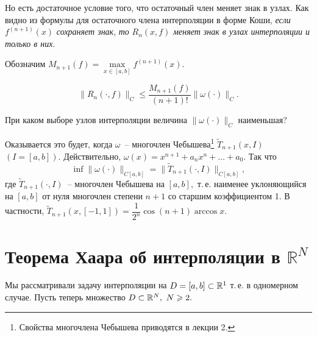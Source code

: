 





Но есть достаточное условие того, что остаточный член меняет знак в узлах. Как видно из
формулы для остаточного члена интерполяции в форме Коши, {\it если} $f^{(n+1)}(x)$
{\it сохраняет знак}, {\it то} $R_n(x,f)$ {\it меняет знак в узлах интерполяции и только в них}.

Обозначим $M_{n+1}(f)=\max\limits_{x \in [a,b]}f^{(n+1)}(x).$

\begin{Corollary}
\[
 \|R_n(\cdot ,f) \|_C \le \frac{M_{n+1}(f)}{(n+1)!}\|\omega(\cdot ) \|_C .
\]
\end{Corollary}

\begin{task}
При каком выборе узлов интерполяции величина $\|\omega(\cdot ) \|_C$
наименьшая?
\end{task}

 Оказывается {это будет,} когда $\omega$~-- многочлен
Чебышева\footnote{{Свойства} многочлена Чебышева приводятся в лекции 2.}
{$\widetilde{T}_{n+1}(x,I)$ $(I=[a,b]).$}
{Действительно, } $\omega(x)=x^{n+1} +a_{n}x^n+ \dots +a_0.$ Так {что}
\[
  \inf \|\omega(\cdot)\|_{C[a,b]}=\|\widetilde{T}_{n+1}(\cdot{, I})\|_{C[a,b]},
\]
где $\widetilde{T}_{n+1}{(\cdot, I)}$~-- многочлен Чебышева
на $[a,b],$ т.\,е. наименее
уклоняющийся на $[a,b]$ от нуля многочлен {степени $n+1$} со
старшим коэффициентом 1. В частности, $\widetilde{T}_{n+1}(x,[-1,1])=
\dfrac1{2^n}\cos(n+1)\arccos x.$


\section{Теорема Хаара об интерполяции в $\mathbb R^N$}

Мы рассматривали {задачу} интерполяции на {$D=[a,b] \subset
\mathbb{R}^1$} т.\,е. в одномерном случае. Пусть теперь множество {$D \subset \mathbb{R}^N,\ N\geqslant 2.$}

